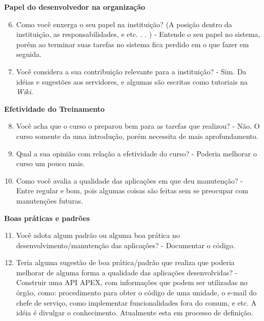 \begin{apendicesenv}
\textbf{Papel do desenvolvedor na organização}

\begin{enumerate}
	\setcounter{enumi}{5}
	\item Como você enxerga o seu papel na instituição? (A posição dentro da instituição, as
	responsabilidades, e etc. . . )\newline
	- Entende o seu papel no sistema, porém ao terminar suas tarefas no sistema fica perdido em o que fazer em seguida.
	\item Você considera a sua contribuição relevante para a instituição?\newline
	- Sim. Da idéias e sugestões aos servidores, e algumas são escritas como tutoriais na \textit{Wiki}.
\end{enumerate}

\textbf{Efetividade do Treinamento}

\begin{enumerate}
	\setcounter{enumi}{7}
	\item Você acha que o curso o preparou bem para as tarefas que realizou?\newline
	- Não. O curso somente da uma introdução, porém necessita de mais aprofundamento.
	\item Qual a sua opinião com relação a efetividade do curso?\newline
	- Poderia melhorar o curso um pouco mais.
	\item Como você avalia a qualidade das aplicações em que deu manutenção?\newline
	- Entre regular e bom, pois algumas coisas são feitas sem se preocupar com manutenções futuras.
\end{enumerate}

\textbf{Boas práticas e padrões}

\begin{enumerate}
	\setcounter{enumi}{10}
	\item Você adota algum padrão ou alguma boa prática no desenvolvimento/manutenção das
	aplicações?\newline
	- Documentar o código.
	\item Teria alguma sugestão de boa prática/padrão que realiza que poderia melhorar de
	alguma forma a qualidade das aplicações desenvolvidas?\newline
	- Construir uma API APEX, com informações que podem ser utilizadas no órgão, como: procedimento para obter o código de uma unidade, o e-mail do chefe de serviço, como implementar funcionalidades fora do comum, e etc. A idéia é divulgar o conhecimento. Atualmente esta em processo de definição.
\end{enumerate}


\end{apendicesenv}
